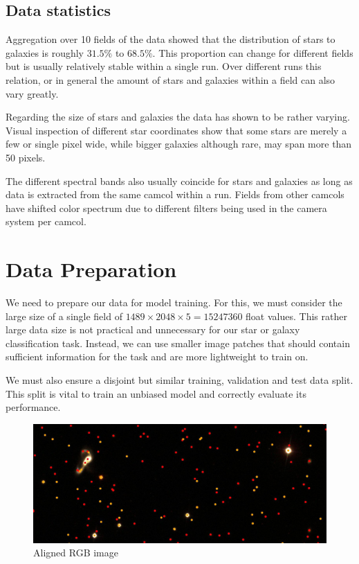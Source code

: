 \documentclass[
a4paper,     %
10pt         %
]{scrartcl}  %
\begin{document}
\subsection{Data statistics}
Aggregation over 10 fields of the data showed that the distribution of stars to galaxies is roughly $31.5\%$ to $68.5\%$.
This proportion can change for different fields but is usually relatively stable within a single run.
Over different runs this relation, or in general the amount of stars and galaxies within a field can also vary greatly.

Regarding the size of stars and galaxies the data has shown to be rather varying.
Visual inspection of different star coordinates show that some stars are merely a few or single pixel wide, while bigger galaxies although rare, may span more than 50 pixels.

The different spectral bands also usually coincide for stars and galaxies as long as data is extracted from the same camcol within a run.
Fields from other camcols have shifted color spectrum due to different filters being used in the camera system per camcol.

\section{Data Preparation}
We need to prepare our data for model training.
For this, we must consider the large size of a single field of $1489 \times 2048 \times 5 = 15247360$ float values.
This rather large data size is not practical and unnecessary for our star or galaxy classification task.
Instead, we can use smaller image patches that should contain sufficient information for the task and are more lightweight to train on.

We must also ensure a disjoint but similar training, validation and test data split.
This split is vital to train an unbiased model and correctly evaluate its performance.

\begin{figure}[h]
    \center
    \includegraphics[width=\textwidth]{figures/crop_marked}
    \caption{Aligned RGB image}\label{fig:marked_rbg}
\end{figure}
\end{document}
